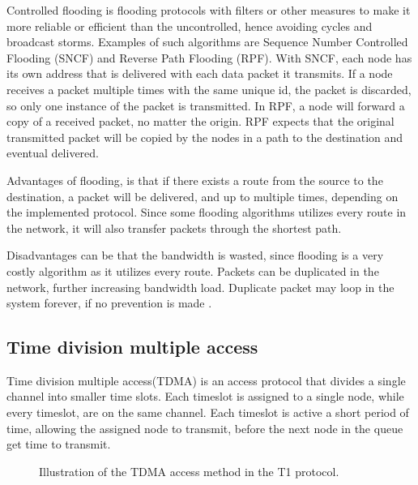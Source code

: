 Controlled flooding is flooding protocols with filters or other measures to make it more reliable or efficient than the uncontrolled, hence avoiding cycles and broadcast storms\cite{controlled_flooding}.
Examples of such algorithms are Sequence Number Controlled Flooding (SNCF) and Reverse Path Flooding (RPF).
With SNCF, each node has its own address that is delivered with each data packet it transmits.
If a node receives a packet multiple times with the same unique id, the packet is discarded, so only one instance of the packet is transmitted.
In RPF, a node will forward a copy of a received packet, no matter the origin.
RPF expects that the original transmitted packet will be copied by the nodes in a path to the destination and eventual delivered\cite{RPF}.

Advantages of flooding, is that if there exists a route from the source to the destination, a packet will be delivered, and up to multiple times, depending on the implemented protocol.
Since some flooding algorithms utilizes every route in the network, it will also transfer packets through the shortest path\cite{flooding}.

Disadvantages can be that the bandwidth is wasted, since flooding is a very costly algorithm as it utilizes every route.
Packets can be duplicated in the network, further increasing bandwidth load.
Duplicate packet may loop in the system forever, if no prevention is made \cite{flooding}.


\subsection{Time division multiple access}
Time division multiple access(TDMA) is an access protocol that divides a single channel into smaller time slots.
Each timeslot is assigned to a single node, while every timeslot, are on the same channel.
Each timeslot is active a short period of time, allowing the assigned node to transmit, before the next node in the queue get time to transmit\cite{TDMA}.

\begin{figure}[!h]
	\centering
	\caption{Illustration of the TDMA access method in the T1 protocol\cite{TDMA}.}
	\label{fig:TDMAfigure}
\end{figure}

